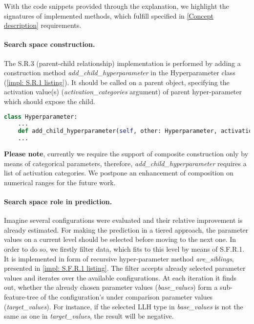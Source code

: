 With the code snippets provided through the explanation, we highlight the signatures of implemented methods, which fulfill specified in \cref{Concept description} requirements.

\paragraph{Search space construction.} The S.R.3 (parent-child relationship) implementation is performed by adding a construction method \emph{add\_child\_hyperparameter} in the Hyperparameter class (\cref{impl: S.R.1 listing}). It should be called on a parent object, specifying the activation value(s) (\emph{activation\_categories} argument) of parent hyper-parameter which should expose the child. 

\begin{lstlisting}[language=Python, caption=S.R.1 implementation., label=impl: S.R.1 listing]
class Hyperparameter:
	...
	def add_child_hyperparameter(self, other: Hyperparameter, activation_categories: Iterable[CATEGORY]) -> Hyperparameter
	...
\end{lstlisting}

\textbf{Please note}, currently we require the support of composite construction only by means of categorical parameters, therefore, \emph{add\_child\_hyperparameter} requires a list of activation categories. We postpone an enhancement of composition on numerical ranges for the future work.

\paragraph{Search space role in prediction.}
Imagine several configurations were evaluated and their relative improvement is already estimated. For making the prediction in a tiered approach, the parameter values on a current level should be selected before moving to the next one. In order to do so, we firstly filter data, which fits to this level by means of S.F.R.1. It is implemented in form of recursive hyper-parameter method \emph{are\_siblings}, presented in \cref{impl: S.F.R.1 listing}. The filter accepts already selected parameter values and iterates over the available configurations. At each iteration it finds out, whether the already chosen parameter values (\emph{base\_values}) form a sub-feature-tree of the configuration's under comparison parameter values (\emph{target\_values}). For instance, if the selected LLH type in \emph{base\_values} is not the same as one in \emph{target\_values}, the result will be negative.

